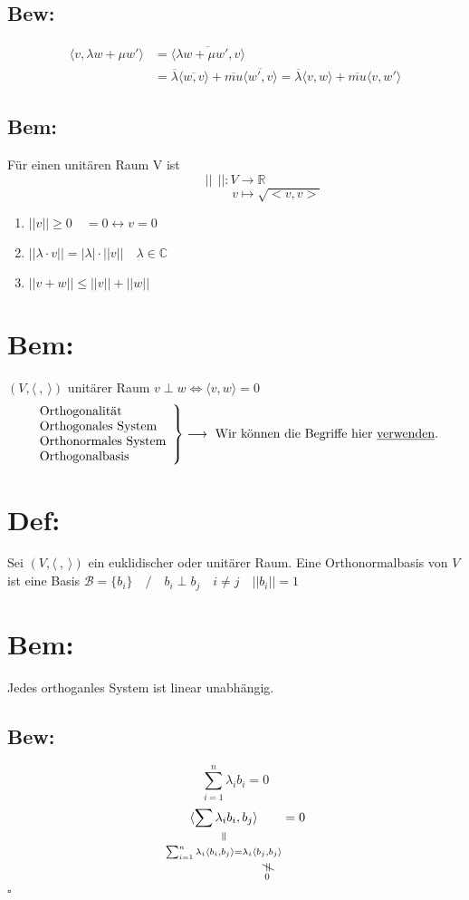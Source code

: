\documentclass[titlepage,12pt,a4paper,ngerman]{report}
\newenvironment{bew}{\subsection{Bew:}}{\hfill$\square$}
\newcommand{\Bew}[1]{\begin{bew}#1\end{bew}}
\newcommand{\verteq}{\rotatebox{90}{$\,=$}}
\newcommand{\equalto}[2]{\underset{\scriptstyle\overset{\mkern4mu\verteq}{#2}}{#1}}
\newcommand{\custo}[3]{\underset{\scriptstyle\overset{\mkern4mu\rotatebox{-90}{$\,#1$}}{#3}}{#2}}
\newcommand{\tx}[1]{\textrm{#1}}
\newcommand{\summ}[2]{\sum_{#1}^{#2}}
\begin{document}
\subsection{Bew:}
\begin{align*}
\langle v,\lambda w + \mu w'\rangle &= \langle \overline{\lambda w + \mu w', v} \rangle \\
&= \overline{\lambda} \langle \overline{w,v}\rangle + \overline{mu}\langle \overline{w',v}\rangle  = \overline{\lambda}\langle v,w \rangle + \overline{mu}\langle v,w'\rangle 
\end{align*}
\subsection{Bem:}
Für einen unitären Raum V ist
$$ || \ \ ||: V \to \mathbb{R}$$
$$ \qquad \qquad \qquad \ \ \, v \mapsto \sqrt{<v,v>}$$
\begin{enumerate}[1)]
	\item $ ||v|| \ge 0 \quad = 0 \leftrightarrow v = 0 $
	\item $ || \lambda \cdot v || = | \lambda| \cdot ||v|| \quad \lambda \in \mathbb{C} $
	\item $ ||v+w|| \le ||v|| + ||w|| $
\end{enumerate}

\section*{Bem:}
$(V, \langle\ ,\ \rangle)$ unitärer Raum $v \perp w \Leftrightarrow \langle v,w \rangle = 0$
$$\left. \begin{array}{l}
\tx{Orthogonalität} \\ \tx{Orthogonales System} \\ \tx{Orthonormales System} \\ \tx{Orthogonalbasis}
\end{array} \right  \} \longrightarrow \tx{ Wir können die Begriffe hier \underline{verwenden}.}$$
\section{Def:} Sei $ ( V, \langle\ ,\ \rangle)$ ein euklidischer oder unitärer Raum. Eine Orthonormalbasis von $V$ ist eine Basis $\mathcal B = \{b_i\}\quad /\quad b_i \perp b_j \quad i \neq j \quad ||b_i|| = 1$
\section*{Bem:} Jedes orthoganles System ist linear unabhängig.
\Bew{$$\summ{i=1}{n}\lambda_i b_i = 0$$
	$$\equalto{\langle \sum \lambda_i b_i, b_j\rangle}{\summ{i=1}{n}\lambda_i \langle b_i, b_j \rangle = \lambda_i \custo{\neq}{\langle b_j,b_j \rangle}{0}} = 0$$}
\end{document}
